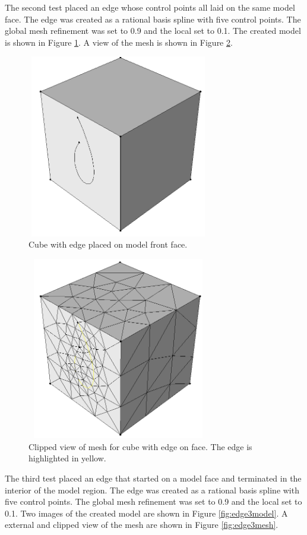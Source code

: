 \documentclass[a4paper, 12pt]{article}
\begin{document}
The second test placed an edge whose control points all laid on the same 
model face. 
The edge was created as a rational basis spline with five control points.
The global mesh refinement was set to 0.9 and the local set to 0.1. 
The created model is shown in Figure \ref{fig:edge2model}.
A view of the mesh is shown in Figure \ref{fig:edge2mesh}.

\begin{figure}[H]
  \centering
  \includegraphics[width=8cm, height=8cm]{test7_smd}
  \caption{Cube with edge placed on model front face.}
  \label{fig:edge2model}
\end{figure}

\begin{figure}[H]
  \centering
  \includegraphics[width=8cm, height=8cm]{test7_sms}
  \caption{Clipped view of mesh for cube with edge on face. 
          The edge is highlighted in yellow.}
  \label{fig:edge2mesh}
\end{figure}

The third test placed an edge that started on a model face and 
terminated in the interior of the model region. 
The edge was created as a rational basis spline with five control points.
The global mesh refinement was set to 0.9 and the local set to 0.1. 
Two images of the created model are shown in Figure \ref{fig:edge3model}.
A external and clipped view of the mesh are 
shown in Figure \ref{fig:edge3mesh}.
\end{document}
